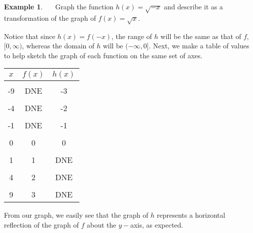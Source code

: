 \documentclass[12pt]{book}
\theoremstyle{definition}
\newtheorem{example}{Example}
\begin{document}
\begin{example}~~~Graph the function $h(x)=\sqrt{-x}$ and describe it as a transformation of the graph of $f(x)=\sqrt{x}$.\par
Notice that since $h(x)=f(-x)$, the range of $h$ will be the same as that of $f$, $[0,\infty)$, whereas the domain of $h$ will be $(-\infty,0]$.  Next, we make a table of values to help sketch the graph of each function on the same set of axes.
\begin{center}
\begin{tabular}{c||c|c}
$x$ & $f(x)$ &  $h(x)$ \\
\hline
&&\\
-9 & DNE &  -3 \\
&&\\
-4 & DNE &  -2 \\
&&\\
-1 & DNE &  -1 \\
&&\\
0 & 0 &  0 \\
&&\\
1 & 1 &  DNE \\
&&\\
4 & 2 &  DNE \\
&&\\
9 & 3 &  DNE 
\end{tabular}
\end{center}
\begin{center}
\end{center}
From our graph, we easily see that the graph of $h$ represents a horizontal reflection of the graph of $f$ about the $y-$axis, as expected.
\end{example}
\end{document}
